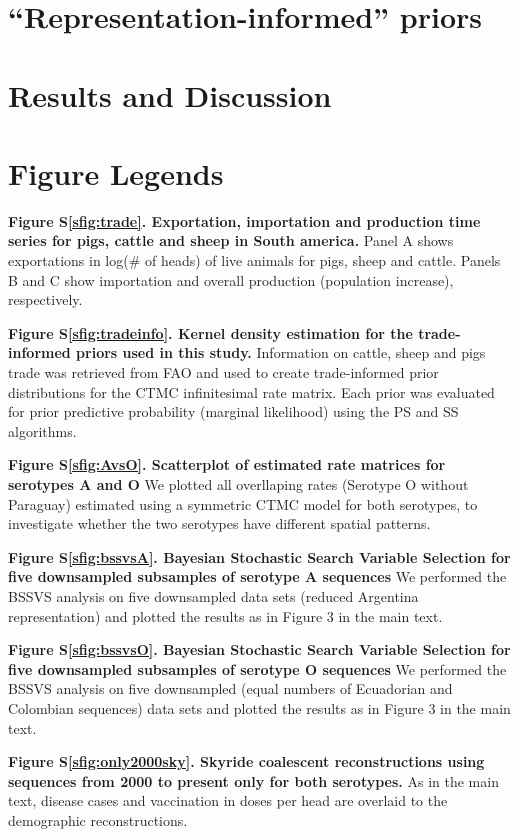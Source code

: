 \documentclass[a4paper,10pt]{article}
\begin{document}
\section{``Representation-informed'' priors}
\section{Results and Discussion}
\section*{Figure Legends}
\textbf{Figure S\ref{sfig:trade}. Exportation, importation and production time series for pigs, cattle and sheep in South america.} Panel A shows exportations in log(\# of heads) of live animals for pigs, sheep and cattle.
Panels B and C show importation and overall production (population increase), respectively.

\textbf{Figure S\ref{sfig:tradeinfo}. Kernel density estimation for the trade-informed priors used in this study.} Information on cattle, sheep and pigs trade was retrieved from FAO and used to create trade-informed prior distributions for the CTMC infinitesimal rate matrix.
Each prior was evaluated for prior predictive probability (marginal likelihood) using the PS and SS algorithms. 

\textbf{Figure S\ref{sfig:AvsO}. Scatterplot of estimated rate matrices for serotypes A and O} We plotted all overllaping rates (Serotype O without Paraguay) estimated using a symmetric CTMC model for both serotypes, to investigate whether the two serotypes have different spatial patterns.

\textbf{Figure S\ref{sfig:bssvsA}. Bayesian Stochastic Search Variable Selection for five downsampled subsamples of serotype A sequences} We performed the BSSVS analysis on five downsampled data sets (reduced Argentina representation) and plotted the results as in Figure 3 in the main text.

\textbf{Figure S\ref{sfig:bssvsO}. Bayesian Stochastic Search Variable Selection for five downsampled subsamples of serotype O sequences} We performed the BSSVS analysis on five downsampled (equal numbers of Ecuadorian and Colombian sequences) data sets and plotted the results as in Figure 3 in the main text.

\textbf{Figure S\ref{sfig:only2000sky}. Skyride coalescent reconstructions using sequences from 2000 to present only for both serotypes.}
As in the main text, disease cases and vaccination in doses per head are overlaid to the demographic reconstructions.
\end{document}
